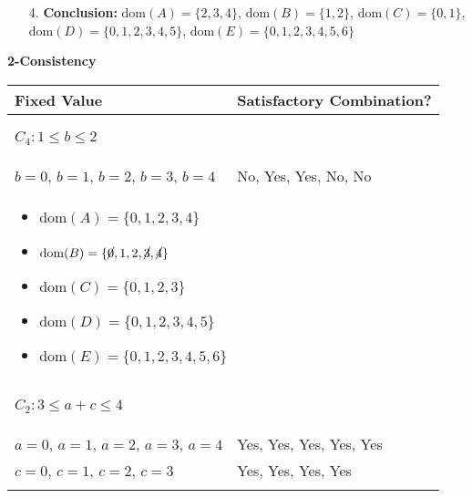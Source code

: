 \begin{example}
    \begin{enumerate}
        \item[4. ] \textbf{Conclusion:} $\text{dom}(A) = \{2, 3, 4\}$, $\text{dom}(B) = \{1, 2\}$, $\text{dom}(C) = \{0, 1\} $, $\text{dom}(D) = \{0, 1, 2, 3, 4, 5\}$, $\text{dom}(E) = \{0, 1, 2, 3, 4, 5, 6\}$
    \end{enumerate}
\end{example}
\newpage

\begin{example} \textbf{2-Consistency}
    \begin{center}
        \begin{tabular}{ll}
            \textbf{Fixed Value} & \textbf{Satisfactory Combination?} \\
            \toprule
            \multicolumn{2}{p{\linewidth}}{
            \begin{center}
                $C_4: 1 \leq b \leq 2$
            \end{center}} \\
            \midrule
                $b = 0$, $b=1$, $b=2$, $b=3$, $b=4$ & No, Yes, Yes, No, No \\
            \multicolumn{2}{p{\linewidth}}{
            \begin{itemize}
                \item $\text{dom}(A) = \{0, 1, 2, 3, 4\}$
                \item $\text{dom}(B) = \{\cancel{0}, 1, 2, \cancel{3}, \cancel{4}\} $
                \item $\text{dom}(C) = \{0, 1, 2, 3\} $
                \item $\text{dom}(D) = \{0, 1, 2, 3, 4, 5\} $
                \item $\text{dom}(E) = \{0, 1, 2, 3, 4, 5, 6\} $
            \end{itemize}} \\
            \midrule
            \multicolumn{2}{p{\linewidth}}{
            \begin{center}
                $C_2: 3 \leq a + c \leq 4$
            \end{center}} \\
            \midrule
                $a=0$, $a=1$, $a=2$, $a=3$, $a=4$ & Yes, Yes, Yes, Yes, Yes \\
                $c=0$, $c=1$, $c=2$, $c=3$ & Yes, Yes, Yes, Yes \\
            \multicolumn{2}{p{\linewidth}}{
            \begin{itemize}

\end{itemize}}
\end{tabular}
\end{center}
\end{example}
